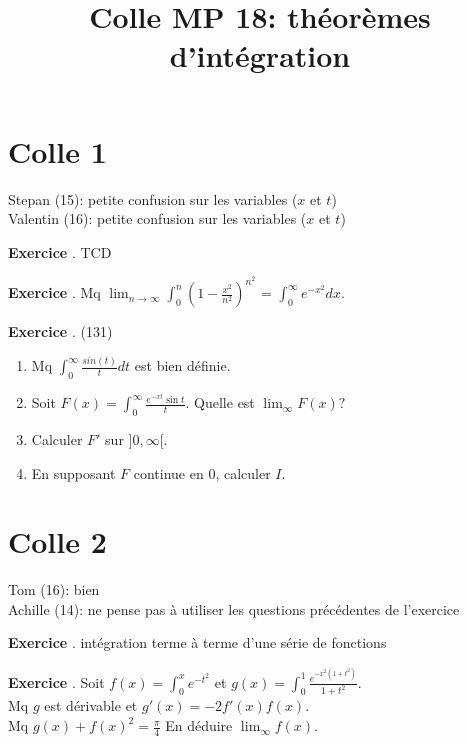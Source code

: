 \documentclass[10pt,a4paper]{article}
\title{Colle MP 18: théorèmes d'intégration}
\newcounter{question}
\newcounter{exo}
\newenvironment{exo}{\vspace{0.5cm}\setcounter{question}{0}\addtocounter{exo}{1} \noindent \textbf{Exercice \theexo}. \normalsize }{\par}
\begin{document}
	\maketitle
	
	\section*{Colle 1}
	Stepan (15): petite confusion sur les variables ($x$ et $t$)\\
	Valentin (16): petite confusion sur les variables ($x$ et $t$)\\
	
	\begin{exo}
		TCD
	\end{exo}

	\begin{exo}
		Mq $\lim_{n \rightarrow \infty} \int_0^n (1 - \frac{x^2}{n^2})^{n^2}$ = $\int_0^\infty e^{-x^2}dx$.
	\end{exo}

	\begin{exo} (131)
		\begin{enumerate}
			\item Mq $\int_0^\infty \frac{sin(t)}{t} dt$ est bien définie.
			\item Soit $F(x) = \int_{0}^{\infty} \frac{e^{-xt} \sin t}{t}$. Quelle est $\lim_{\infty} F(x)?$
			\item Calculer $F'$ sur $]0, \infty[$.
			\item En supposant $F$ continue en 0, calculer $I$.
		\end{enumerate}
	\end{exo}
		
	\section*{Colle 2}
	\setcounter{exo}{0}
	Tom (16): bien\\
	Achille (14): ne pense pas à utiliser les questions précédentes de l'exercice\\
	
	\begin{exo}
		intégration terme à terme d’une série de fonctions	\end{exo}

	\begin{exo}
		Soit $f(x) = \int_{0}^{x} e^{-t^2}$ et $g(x) = \int_{0}^{1} \frac{e^{-x^2 (1+t^2)}}{1+t^2}$.\\
		Mq $g$ est dérivable et $g'(x) = -2f'(x) f(x)$.\\
		Mq $g(x) + f(x)^2 = \frac{\pi}{4}$
		En déduire $\lim_\infty f(x)$.
	\end{exo}
	
\end{document}

